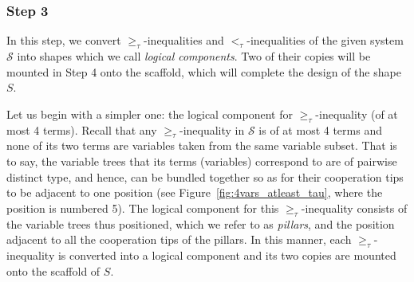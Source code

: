 \documentclass{article}
\theoremstyle{remark}
\theoremstyle{definition}
\begin{document}
\subsubsection*{Step 3}

In this step, we convert $\ge_\tau$-inequalities and $<_\tau$-inequalities of the given system $\mathcal{S}$ into shapes which we call {\it logical components}. 
Two of their copies will be mounted in Step 4 onto the scaffold, which will complete the design of the shape $S$. 

Let us begin with a simpler one: the logical component for $\ge_\tau$-inequality (of at most 4 terms). 
Recall that any $\ge_\tau$-inequality in $\mathcal{S}$ is of at most 4 terms and none of its two terms are variables taken from the same variable subset. 
That is to say, the variable trees that its terms (variables) correspond to are of pairwise distinct type, and hence, can be bundled together so as for their cooperation tips to be adjacent to one position (see Figure~\ref{fig:4vars_atleast_tau}, where the position is numbered 5).
The logical component for this $\ge_\tau$-inequality consists of the variable trees thus positioned, which we refer to as {\it pillars}, and the position adjacent to all the cooperation tips of the pillars. 
In this manner, each $\ge_\tau$-inequality is converted into a logical component and its two copies are mounted onto the scaffold of $S$. 
\end{document}
